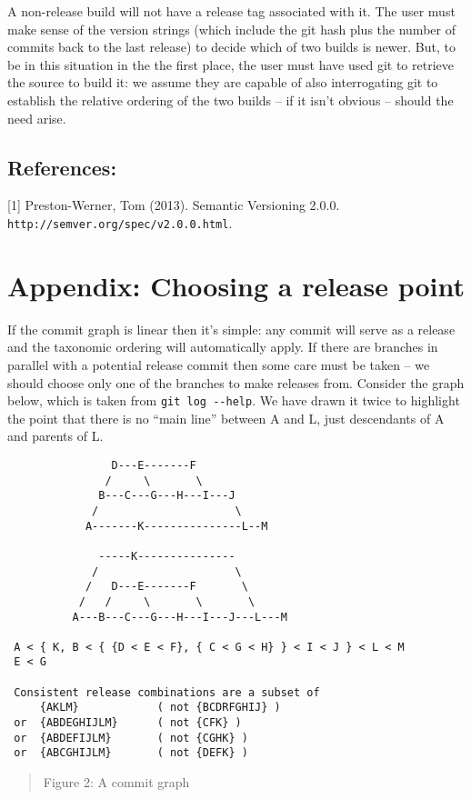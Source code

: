 \documentclass[11pt]{article}
\begin{document}
A non-release build will not have a release tag associated with it. The user
must make sense of the version strings (which include the git hash plus the
number of commits back to the last release) to decide which of two builds
is newer. But, to be in this situation in the the first place, the user must
have used git to retrieve the source to build it: we assume they are capable
of also interrogating git to establish the relative ordering of the two
builds -- if it isn't obvious -- should the need arise.

\subsection*{References:}

[1] Preston-Werner, Tom (2013). Semantic Versioning 2.0.0.\\
    \verb|http://semver.org/spec/v2.0.0.html|.

\newpage
\section*{Appendix: Choosing a release point}

If the commit graph is linear then it's simple: any commit will serve as a
release and the taxonomic ordering will automatically apply. If there are
branches in parallel with a potential release commit then some care must be
taken -- we should choose only one of the branches to make releases
from. Consider the graph below, which is taken from \verb|git log --help|.
We have drawn it twice to highlight the point that there is no ``main line''
between A and L, just descendants of A and parents of L.

\begin{verbatim}
                D---E-------F
               /     \       \
              B---C---G---H---I---J
             /                     \
            A-------K---------------L--M

              -----K---------------
             /                     \
            /   D---E-------F       \
           /   /     \       \       \
          A---B---C---G---H---I---J---L---M

 A < { K, B < { {D < E < F}, { C < G < H} } < I < J } < L < M
 E < G                     

 Consistent release combinations are a subset of
     {AKLM}            ( not {BCDRFGHIJ} )
 or  {ABDEGHIJLM}      ( not {CFK} )
 or  {ABDEFIJLM}       ( not {CGHK} )
 or  {ABCGHIJLM}       ( not {DEFK} )
\end{verbatim}
\begin{quote}
  Figure 2: A commit graph
\end{quote}
\end{document}
